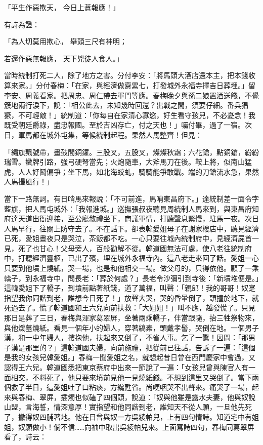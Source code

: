 「平生作惡欺天，  今日上蒼報應！」

有詩為證：

「為人切莫用欺心，  舉頭三尺有神明；

若還作惡無報應，  天下兇徒人食人。」

當時統制打死二人，除了地方之害。分付李安：「將馬頭大酒店還本主，把本錢收算來家。」分付春梅：「在家，與經濟做齋累七，打發城外永福寺擇吉日葬埋。」留李安、周義看家。把周忠、周仁帶去軍門等應。春梅晚夕與孫二娘置酒送餞，不覺簇地兩行淚下，說：「相公此去，未知幾時回還？出戰之間，須要仔細。番兵猖獗，不可輕敵！」統制道：「你每自在家清心寡慾，好生看守孩兒，不必憂念！我既受朝廷爵祿，盡忠報國。至於吉凶存亡，付之天也！」囑付畢，過了一宿。次日，軍馬都在城外屯集，等候統制起程。果然人馬整齊！但見：

「繡旗飄號帶，畫鼓間銅鑼。三股叉，五股叉，燦燦秋霜；六花鎗，點銅鎗，紛紛瑞雪。蠻牌引路，強弓硬弩當先；火炮隨車，大斧馬刀在後。鞍上將，似南山猛虎，人人好鬬偏爭；坐下馬，如北海蛟虬，騎騎能爭敢戰。端的刀鎗流水急，果然人馬撮風行！」

當下一路無詞。有日哨馬來報說：「不可前進，馬哨東昌府下。」達統制差一面令字藍旗，把人馬屯城外：「我報進城。」巡撫張叔夜聽見周統制人馬來到，與東昌府知府達天道出衙迎接，至公廳敘禮坐下，商議軍情，打聽聲息緊慢，駐馬一夜。次日人馬早行，往關上防守去了。不在話下。卻表韓愛姐母子在謝家樓店中，聽見經濟已死，愛姐晝夜只是哭泣，茶飯都不吃。一心只要往城內統制府中，見經濟屍首一見，死了也甘心！父母旁人，百般勸解不從。韓道國無法可處，使八老往統制府中，打聽經濟靈柩，已出了殯，埋在城外永福寺內。這八老走來回了話。愛姐一心只要到他墳上燒紙，哭一場，也是和他相交一場。做父母的，只得依他。顧了一乘轎子，到永福寺中，問長老：「葬於何處？」長老令沙彌引到寺後：「新墳堆便是。」這韓愛姐下了轎子，到墳前點著紙錢，道了萬福，叫聲：「親郎！我的哥哥！奴寔指望我你同諧到老，誰想今日死了！」放聲大哭，哭的昏暈倒了，頭撞於地下，就死過去了。慌了韓道國和王六兒向前扶救：「大姐姐！」叫不應，越發慌了。只見那日是葬了三日，春梅與渾家葛翠屏，坐著兩乘轎子，伴當跟隨，抬三牲祭物來，與他煖墓燒紙。看見一個年小的婦人，穿著縞素，頭戴孝髻，哭倒在地。一個男子漢，和一中年婦人，摟抱他，扶起來又倒了，不省人事。乞了一驚！因問：「那男子漢是那里的？」這韓道國夫婦，向前施禮，把從前已往話，告訴了一遍：「這個是我的女孩兒韓愛姐。」春梅一聞愛姐之名，就想起昔日曾在西門慶家中會過，又認得王六兒。韓道國悉把東京蔡府中出來一節說了一遍：「女孩兒曾與陳官人有一面相交，不料死了，他只要來墳前見他一見燒紙錢。不想到這里又哭倒了。當下兩個救了半日，這愛姐吐了口粘痰，方纔甦省。尚哽咽哭不出聲來。痛哭了一場，起來與春梅、翠屏，插燭也似磕了四個頭，說道：「奴與他雖是露水夫妻，他與奴說山盟，言海誓，情深意厚！實指望和他同諧到老，誰知天不從人願，一旦他先死了，撇得奴四脯著地。他在日曾與奴一方吳綾帕兒，上有四句情詩。知道宅中有姐姐，奴願做小！倘不信……向袖中取出吳綾帕兒來。上面寫詩四句，春梅同葛翠屏看了，詩云：

